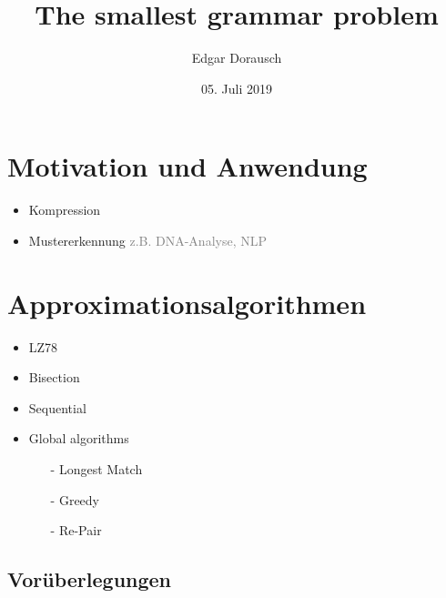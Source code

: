 \documentclass[xcolor=dvipsnames]{beamer}
\title{The smallest grammar problem}
\date{05. Juli 2019}
\author{Edgar Dorausch}
\begin{document}
\maketitle


\newcommand{\SubItem}[1]{
  \setlength\itemindent{15pt} \item[-] #1
}
\newcommand{\Gap}{$ $ \linebreak}
\newcommand{\FrameName}{
	\ifthenelse{\equal{\subsecname}{}}{
		\secname
	}{
		\secname \thinspace -\thinspace\subsecname
	}
}

\newcommand{\Fresh}{\ddagger}
\newcommand{\Hint}[1]{\textcolor{gray}{#1}}

\newcommand{\PDFC}[1]{
	\ifthenelse{\boolean{WithComments}}{
		\pdfcomment[color=red,icon=Note]{#1}
	}{
	}
}

\section{Motivation und Anwendung}

\begin{frame}{\FrameName}
	\begin{itemize}[<+->]
		\item Kompression
		\item Mustererkennung \linebreak
		\Hint{z.B. DNA-Analyse, NLP}
	\end{itemize}
\end{frame}







\section{Approximationsalgorithmen}

\begin{frame}{\FrameName}
	\begin{itemize}[<+->]
		\item LZ78
		\item Bisection 
		\item Sequential
		\item Global algorithms
		\begin{itemize}
			\item[-] Longest Match
			\item[-] Greedy
			\item[-] Re-Pair
		\end{itemize}
	\end{itemize}
\end{frame}

\subsection{Vorüberlegungen}

\newcommand{\LowerBound}{\textcolor{TealBlue}{f_l(n)}}
\newcommand{\UpperBound}{\textcolor{Salmon}{f_u(n)}}








\end{document}
